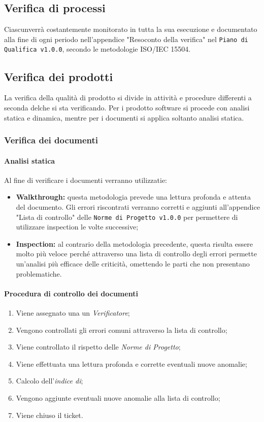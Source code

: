 \subsection{Verifica di processi}
Ciascunverrà costantemente monitorato in tutta la sua esecuzione e documentato alla fine di ogni periodo nell'appendice "Resoconto della verifica" nel \texttt{Piano di Qualifica v1.0.0}, secondo le metodologie ISO/IEC 15504.

\subsection{Verifica dei prodotti}
La verifica della qualità di prodotto si divide in attività e procedure differenti a seconda delche si sta verificando. Per i prodotto software si procede con analisi statica e dinamica, mentre per i documenti si applica soltanto analisi statica.
\subsubsection{Verifica dei documenti}
\paragraph{Analisi statica}
Al fine di verificare i documenti verranno utilizzatie:
\begin{itemize}
	\item \textbf{Walkthrough:} questa metodologia prevede una lettura profonda e attenta del documento. Gli errori riscontrati verranno corretti e aggiunti all'appendice "Lista di controllo" delle \texttt{Norme di Progetto v1.0.0} per permettere di utilizzare inspection le volte successive;
	\item \textbf{Inspection:} al contrario della metodologia precedente, questa risulta essere molto più veloce perché attraverso una lista di controllo degli errori permette un'analisi più efficace delle criticità, omettendo le parti che non presentano problematiche. 
\end{itemize}
\paragraph{Procedura di controllo dei documenti}
\begin{enumerate}
	\item Viene assegnato una un \textit{Verificatore};
	\item Vengono controllati gli errori comuni attraverso la lista di controllo;
	\item Viene controllato il rispetto delle \textit{Norme di Progetto};
	\item Viene effettuata una lettura profonda e corrette eventuali nuove anomalie;
	\item Calcolo dell'\textit{indice di};
	\item Vengono aggiunte eventuali nuove anomalie alla lista di controllo;
	\item Viene chiuso il ticket.
\end{enumerate}
